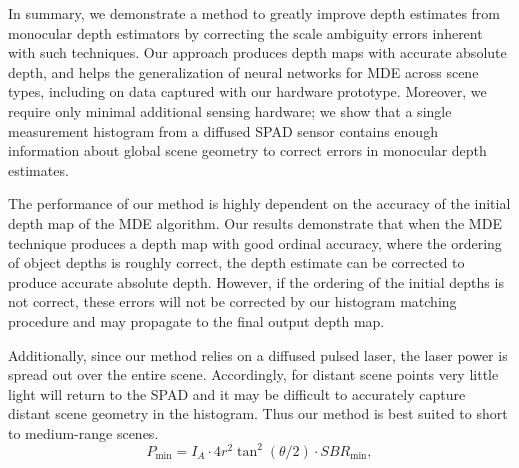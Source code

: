 In summary, we demonstrate a method to greatly improve depth estimates from
monocular depth estimators by correcting the scale ambiguity errors inherent
with such techniques.  Our approach produces depth maps with accurate absolute
depth, and helps the generalization of neural networks for MDE across scene
types, including on data captured with our hardware prototype.  Moreover, we
require only minimal additional sensing hardware; we show that a single measurement
histogram from a diffused SPAD sensor contains enough information about global
scene geometry to correct errors in monocular depth estimates.


The performance of our method is highly dependent on the accuracy of the initial
depth map of the MDE algorithm.
Our results demonstrate that when the MDE technique produces a depth map
with good ordinal accuracy, where the ordering of object depths is roughly correct, the
depth estimate can be corrected to produce accurate absolute depth. However, if
the ordering of the initial depths is not correct, these errors will not be
corrected by our histogram matching procedure and may propagate to the final
output depth map.


Additionally, since our method relies on a diffused pulsed laser, the laser
power is spread out over the entire scene. Accordingly, for distant scene points very
little light will return to the SPAD and it may be difficult to accurately
capture distant scene geometry in the histogram. Thus our method is best suited
to short to medium-range scenes. 
%
\begin{equation}
  P_{\text{min}} = I_A \cdot 4 r^2 \tan^2(\theta/2) \cdot SBR_{\text{min}},
\end{equation} 


